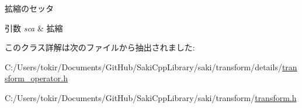 拡縮のセッタ 


\begin{DoxyParams}{引数}
{\em sca} & 拡縮 \\
\hline
\end{DoxyParams}


このクラス詳解は次のファイルから抽出されました\+:\begin{DoxyCompactItemize}
\item 
C\+:/\+Users/tokir/\+Documents/\+Git\+Hub/\+Saki\+Cpp\+Library/saki/transform/details/\mbox{\hyperlink{transform__operator_8h}{transform\+\_\+operator.\+h}}\item 
C\+:/\+Users/tokir/\+Documents/\+Git\+Hub/\+Saki\+Cpp\+Library/saki/transform/\mbox{\hyperlink{transform_8h}{transform.\+h}}\end{DoxyCompactItemize}
